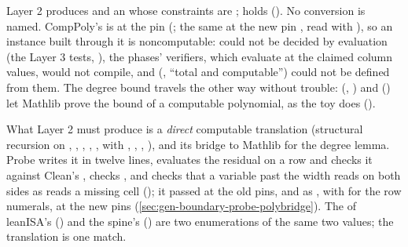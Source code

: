 \begin{sloppypar}
Layer 2 produces  and an
 whose constraints are ;  holds
 (). No conversion is named.
CompPoly's  is
 at the pin  (; the same at the
new pin , read with ), so an instance built through it is
noncomputable:  could not be decided by evaluation (the
Layer 3 tests, ), the phases' verifiers, which evaluate  at the
claimed column values, would not compile, and  (, \enquote{total and
computable}) could not be defined from them. The degree bound travels the other way without
trouble: 
(, ) and  ()
let Mathlib prove the bound of a computable polynomial, as the toy does
().
\end{sloppypar}

What Layer 2 must produce is a \emph{direct} computable translation
 (structural recursion on , ,
, , , with , ,
\bndc{+}, \bndc{*}), and its bridge to Mathlib for the degree lemma. Probe  writes it
in twelve lines, evaluates the  residual  on a row and checks it
against Clean's , checks , and checks that a variable
past the width reads  on both sides as  reads a missing cell
(); it passed at the old pins, and as , with
 for the row numerals, at the new pins (\cref{sec:gen-boundary-probe-polybridge}).
The  of leanISA's  () and the spine's
 () are two enumerations of the same two values; the
translation is one match.

